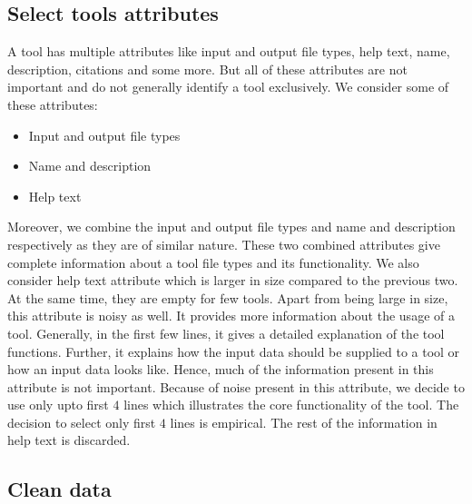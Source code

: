 \subsection{Select tools attributes}
A tool has multiple attributes like input and output file types, help text, name, description, citations and some more. But all of these attributes are not important and do not generally identify a tool exclusively. We consider some of these attributes:
\begin{itemize}
	\item Input and output file types
	\item Name and description
	\item Help text
\end{itemize}
Moreover, we combine the input and output file types and name and description respectively as they are of similar nature. These two combined attributes give complete information about a tool file types and its functionality. We also consider help text attribute which is larger in size compared to the previous two. At the same time, they are empty for few tools. Apart from being large in size, this attribute is noisy as well. It provides more information about the usage of a tool. Generally, in the first few lines, it gives a detailed explanation of the tool functions. Further, it explains how the input data should be supplied to a tool or how an input data looks like. Hence, much of the information present in this attribute is not important. Because of noise present in this attribute, we decide to use only upto first $4$ lines which illustrates the core functionality of the tool. The decision to select only first $4$ lines is empirical. The rest of the information in help text is discarded. 

\subsection{Clean data}
